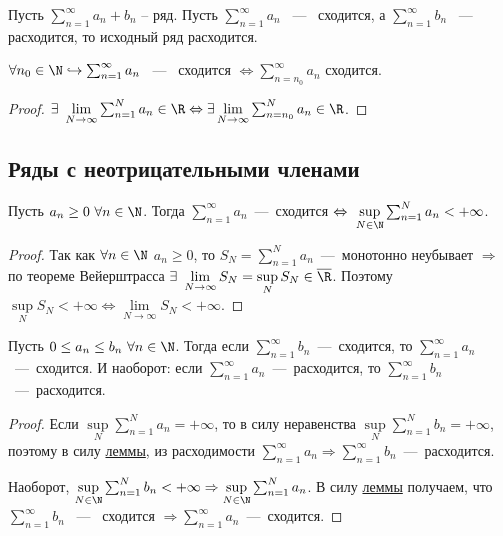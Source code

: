 \begin{corollary}
    Пусть $\sum_{n = 1}^{\infty} a_n + b_n$ -- ряд. Пусть $\sum_{n = 1}^{\infty} a_n$ ~---~ сходится, а $\sum_{n = 1}^{\infty} b_n$ ~---~ расходится, то исходный ряд расходится. 
\end{corollary}

\begin{theorem} 
    $\forall n_0 \in \N \hookrightarrow \sum_{n = 1}^{\infty} a_n$ ~---~ сходится $\Leftrightarrow \sum_{n = n_0}^{\infty} a_n$ сходится.
\end{theorem}

\begin{proof}
    $\exists \ \lim\limits_{N \rightarrow \infty} \sum_{n = 1}^{N} a_n \in \R \Leftrightarrow \exists \lim \limits_{N \rightarrow \infty } \sum_{n = n_0}^{N} a_n \in \R$.
\end{proof}

\subsection{Ряды с неотрицательными членами}

\begin{lemma}
    \hypertarget{lemm18.1}{Пусть $a_n \ge 0 \ \forall n \in \N$. Тогда $\sum_{n = 1}^{\infty} a_n$~---~сходится $\Leftrightarrow \ \sup\limits_{N \in \N} \sum_{n = 1}^{N} a_n < +\infty$.}
\end{lemma}

\begin{proof}
    Так как $\forall n \in \N$ $a_n \geq 0$, то $S_N = \sum_{n = 1}^{N} a_n$~---~монотонно неубывает $\Rightarrow$ по теореме Вейерштрасса $\exists \ \lim \limits_{N \rightarrow \infty }S_N = \sup\limits_{N} S_N \in \overline{\R}$. Поэтому $\sup \limits_{N} S_N < +\infty \Leftrightarrow \lim \limits_{N \rightarrow \infty} S_N < + \infty$.
\end{proof}

\begin{theorem}
    Пусть $0 \le a_n \le b_n \ \forall n \in \N$. Тогда если $\sum_{n = 1}^{\infty} b_n$~---~сходится, то $\sum_{n = 1}^{\infty} a_n$~---~сходится. И наоборот: если $\sum_{n = 1}^{\infty} a_n$~---~расходится, то $\sum_{n = 1}^{\infty} b_n$~---~расходится.
\end{theorem}

\begin{proof}
    Если $\sup \limits_{N} \sum\limits_{n = 1}^N a_n = +\infty$, то в силу неравенства $\sup\limits_{N} \sum_{n = 1}^{N} b_n = + \infty$, поэтому в силу \hyperlink{lemm18.1}{леммы}, из расходимости $\sum_{n = 1}^{\infty} a_n \Rightarrow \sum_{n = 1}^{\infty} b_n$~---~расходится. 

    \noindent Наоборот, $\sup \limits_{N \in \N} \sum_{n = 1}^{N} b_n < + \infty \Rightarrow \sup\limits_{N \in \N} \sum_{n = 1}^{N} a_n$. В силу \hyperlink{lemm18.1}{леммы} получаем, что $\sum_{n = 1}^{\infty} b_n$ ~---~ сходится $\Rightarrow \sum_{n = 1}^{\infty} a_n$~---~сходится.
\end{proof}

